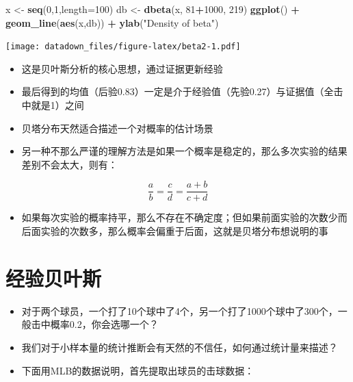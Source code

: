 \documentclass[]{book}
\newenvironment{Shaded}{\begin{snugshade}}{\end{snugshade}}
\newcommand{\DataTypeTok}[1]{\textcolor[rgb]{0.13,0.29,0.53}{#1}}
\newcommand{\DecValTok}[1]{\textcolor[rgb]{0.00,0.00,0.81}{#1}}
\newcommand{\KeywordTok}[1]{\textcolor[rgb]{0.13,0.29,0.53}{\textbf{#1}}}
\newcommand{\NormalTok}[1]{#1}
\newcommand{\OperatorTok}[1]{\textcolor[rgb]{0.81,0.36,0.00}{\textbf{#1}}}
\newcommand{\StringTok}[1]{\textcolor[rgb]{0.31,0.60,0.02}{#1}}
\providecommand{\tightlist}{%
  \setlength{\itemsep}{0pt}\setlength{\parskip}{0pt}}
\begin{document}
\begin{Shaded}
\begin{Highlighting}[]
\NormalTok{x <-}\StringTok{ }\KeywordTok{seq}\NormalTok{(}\DecValTok{0}\NormalTok{,}\DecValTok{1}\NormalTok{,}\DataTypeTok{length=}\DecValTok{100}\NormalTok{)}
\NormalTok{db <-}\StringTok{ }\KeywordTok{dbeta}\NormalTok{(x, }\DecValTok{81}\OperatorTok{+}\DecValTok{1000}\NormalTok{, }\DecValTok{219}\NormalTok{)}
\KeywordTok{ggplot}\NormalTok{() }\OperatorTok{+}\StringTok{ }\KeywordTok{geom_line}\NormalTok{(}\KeywordTok{aes}\NormalTok{(x,db)) }\OperatorTok{+}\StringTok{ }\KeywordTok{ylab}\NormalTok{(}\StringTok{"Density of beta"}\NormalTok{)}
\end{Highlighting}
\end{Shaded}

\texttt{[image: datadown\_files/figure-latex/beta2-1.pdf]}

\begin{itemize}
\item
  这是贝叶斯分析的核心思想，通过证据更新经验
\item
  最后得到的均值（后验0.83）一定是介于经验值（先验0.27）与证据值（全击中就是1）之间
\item
  贝塔分布天然适合描述一个对概率的估计场景
\item
  另一种不那么严谨的理解方法是如果一个概率是稳定的，那么多次实验的结果差别不会太大，则有：
\end{itemize}

\[\frac{a}{b} = \frac{c}{d} = \frac{a+b}{c+d}\]

\begin{itemize}
\tightlist
\item
  如果每次实验的概率持平，那么不存在不确定度；但如果前面实验的次数少而后面实验的次数多，那么概率会偏重于后面，这就是贝塔分布想说明的事
\end{itemize}

\section{经验贝叶斯}

\begin{itemize}
\item
  对于两个球员，一个打了10个球中了4个，另一个打了1000个球中了300个，一般击中概率0.2，你会选哪一个？
\item
  我们对于小样本量的统计推断会有天然的不信任，如何通过统计量来描述？
\item
  下面用MLB的数据说明，首先提取出球员的击球数据：
\end{itemize}
\end{document}

